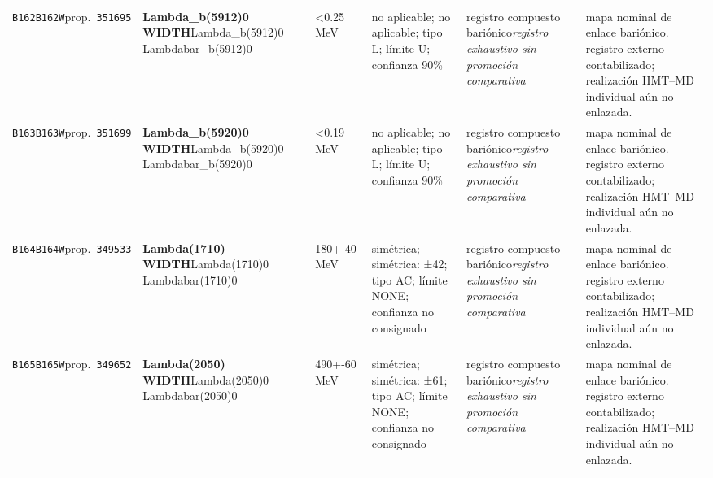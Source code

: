 \begin{landscape}
\begin{longtable}{L{1.85cm}L{4.45cm}L{2.35cm}L{4.05cm}L{3.35cm}L{7.15cm}}
\texttt{B162}\newline \texttt{B162W}\newline prop.\ \texttt{351695} & \textbf{Lambda\_\allowbreak{}b(5912)0 WIDTH}\newline Lambda\_\allowbreak{}b(5912)0 \textbar{}\allowbreak{} Lambdabar\_\allowbreak{}b(5912)0 & \textless{}0.25\,MeV & no aplicable; no aplicable; tipo L; límite U; confianza 90\% & registro compuesto bariónico\newline \emph{registro exhaustivo sin promoción comparativa} & mapa nominal de enlace bariónico. registro externo contabilizado; realización HMT--MD individual aún no enlazada. \\
\texttt{B163}\newline \texttt{B163W}\newline prop.\ \texttt{351699} & \textbf{Lambda\_\allowbreak{}b(5920)0 WIDTH}\newline Lambda\_\allowbreak{}b(5920)0 \textbar{}\allowbreak{} Lambdabar\_\allowbreak{}b(5920)0 & \textless{}0.19\,MeV & no aplicable; no aplicable; tipo L; límite U; confianza 90\% & registro compuesto bariónico\newline \emph{registro exhaustivo sin promoción comparativa} & mapa nominal de enlace bariónico. registro externo contabilizado; realización HMT--MD individual aún no enlazada. \\
\texttt{B164}\newline \texttt{B164W}\newline prop.\ \texttt{349533} & \textbf{Lambda(1710) WIDTH}\newline Lambda(1710)0 \textbar{}\allowbreak{} Lambdabar(1710)0 & 180+-40\,MeV & simétrica; simétrica: ±42; tipo AC; límite NONE; confianza no consignado & registro compuesto bariónico\newline \emph{registro exhaustivo sin promoción comparativa} & mapa nominal de enlace bariónico. registro externo contabilizado; realización HMT--MD individual aún no enlazada. \\
\texttt{B165}\newline \texttt{B165W}\newline prop.\ \texttt{349652} & \textbf{Lambda(2050) WIDTH}\newline Lambda(2050)0 \textbar{}\allowbreak{} Lambdabar(2050)0 & 490+-60\,MeV & simétrica; simétrica: ±61; tipo AC; límite NONE; confianza no consignado & registro compuesto bariónico\newline \emph{registro exhaustivo sin promoción comparativa} & mapa nominal de enlace bariónico. registro externo contabilizado; realización HMT--MD individual aún no enlazada. \\

\end{longtable}
\end{landscape}
